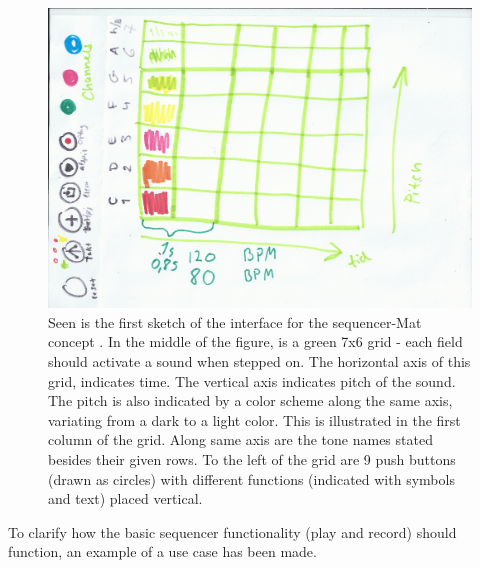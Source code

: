 \begin{figure}[H]
	\centering
	\includegraphics[width=0.9\linewidth]{figure/Design/firstSketchOfMat} 
	\caption{Seen is the first sketch of the interface for the sequencer-Mat concept . In the middle of the figure, is a green 7x6 grid - each field should activate a sound when stepped on. The horizontal axis of this grid, indicates time. The vertical axis indicates pitch of the sound. The pitch is also indicated by a color scheme along the same axis, variating from a dark to a light color. This is illustrated in the first column of the grid. Along same axis are the tone names stated besides their given rows. To the left of the grid are 9 push buttons (drawn as circles) with different functions (indicated with symbols and text) placed vertical. }
	\label{fig:firstSketchOfMatFig}
\end{figure}

To clarify how the basic sequencer functionality (play and record) should function, an example of a use case has been made. \\
